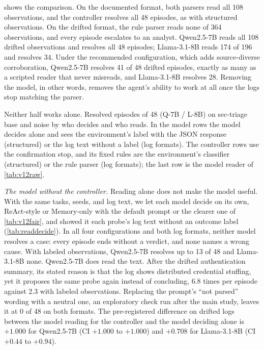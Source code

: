  shows the comparison. On the documented format, both parsers read all 108 observations, and the controller resolves all 48 episodes, as with structured observations. On the drifted format, the rule parser reads none of 364 observations, and every episode escalates to an analyst. Qwen2.5-7B reads all 108 drifted observations and resolves all 48 episodes; Llama-3.1-8B reads 174 of 196 and resolves 34. Under the recommended configuration, which adds source-diverse corroboration, Qwen2.5-7B resolves 41 of 48 drifted episodes, exactly as many as a scripted reader that never misreads, and Llama-3.1-8B resolves 28. Removing the model, in other words, removes the agent's ability to work at all once the logs stop matching the parser.

\begin{table}[t]
  \caption{Neither half works alone. Resolved episodes of 48 (Q-7B / L-8B) on sec-triage base and noise by who decides and who reads. In the model rows the model decides alone and sees the environment's label with the JSON response (structured) or the log text without a label (log formats). The controller rows use the confirmation stop, and its fixed rules are the environment's classifier (structured) or the rule parser (log formats); the last row is the model reader of \cref{tab:v12raw}.}
  \label{tab:readdecide}
  \centering\small
  \begin{adjustbox}{max width=\columnwidth}\end{adjustbox}
\end{table}

\emph{The model without the controller.} Reading alone does not make the model useful. With the same tasks, seeds, and log text, we let each model decide on its own, ReAct-style or Memory-only with the default prompt or the clearer one of \cref{tab:v12fair}, and showed it each probe's log text without an outcome label (\cref{tab:readdecide}). In all four configurations and both log formats, neither model resolves a case: every episode ends without a verdict, and none names a wrong cause. With labeled observations, Qwen2.5-7B resolves up to 13 of 48 and Llama-3.1-8B none. Qwen2.5-7B does read the text. After the drifted authentication summary, its stated reason is that the log shows distributed credential stuffing, yet it proposes the same probe again instead of concluding, 6.8 times per episode against 2.3 with labeled observations. Replacing the prompt's ``not parsed'' wording with a neutral one, an exploratory check run after the main study, leaves it at 0 of 48 on both formats. The pre-registered difference on drifted logs between the model reading for the controller and the model deciding alone is $+1.000$ for Qwen2.5-7B (CI $+1.000$ to $+1.000$) and $+0.708$ for Llama-3.1-8B (CI $+0.44$ to $+0.94$).

